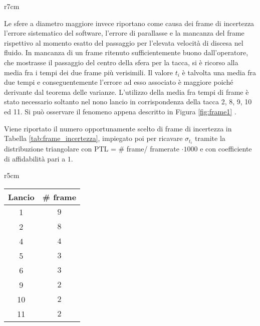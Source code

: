 \documentclass[a4paper,11pt,oneside]{article}
\begin{document}
\begin{wrapfigure}{r}{7cm} %
    \centering
    \caption{Esempio di frame consecutivi, \\ lancio 8, tacca 11}
\end{wrapfigure}
Le sfere a diametro maggiore invece riportano come causa dei frame di incertezza l'errore sistematico del software, l'errore di parallasse e la mancanza del frame rispettivo al momento esatto del passaggio per l'elevata velocità di discesa nel fluido.
In mancanza di un frame ritenuto sufficientemente buono dall'operatore, che mostrasse il passaggio del centro della sfera per la tacca, si è ricorso alla media fra i tempi dei due frame più verisimili. Il valore $t_i$ è talvolta una media fra due tempi e conseguentemente l'errore ad esso associato è maggiore poiché derivante dal teorema delle varianze. L'utilizzo della media fra tempi di frame è stato necessario soltanto nel nono lancio in corrispondenza della tacca 2, 8, 9, 10 ed 11. Si può osservare il fenomeno appena descritto in Figura \ref{fig:frame1} .

Viene riportato il numero opportunamente scelto di frame di incertezza in Tabella \ref{tab:frame_incertezza}, impiegato poi per ricavare $\sigma_{t_{i}}$ tramite la distribuzione triangolare con PTL = \# frame/ framerate $\cdot 1000$ e con coefficiente di affidabilità pari a $1$.\newline


\begin{wraptable}{r}{5cm}
\centering
\caption{Frame di incertezza}
\label{tab:frame_incertezza}
\begin{tabular}{|c|c|}
\hline
Lancio & \# frame  \\ \hline
{\rowcolor[rgb]{0.85,0.85,0.85}}1      & $9$ \\ \hline
2      & $8$ \\ \hline
{\rowcolor[rgb]{0.85,0.85,0.85}}4      & $4$ \\ \hline
5      & $3$ \\ \hline
{\rowcolor[rgb]{0.85,0.85,0.85}}6      & $3$ \\ \hline
9      & $2$ \\ \hline
{\rowcolor[rgb]{0.85,0.85,0.85}}10     & $2$ \\ \hline
11     & $2$ \\ \hline
\end{tabular}
\end{wraptable}
\end{document}
